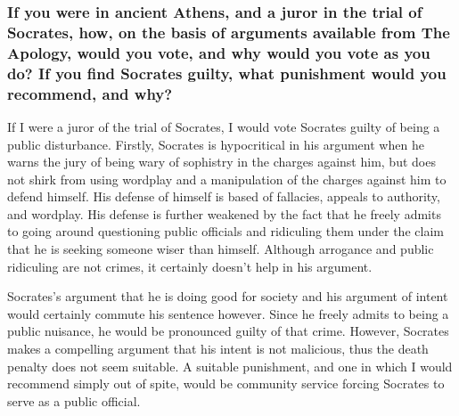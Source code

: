 \documentclass{article}
\begin{document}
\subsubsection*{If you were in ancient Athens, and a juror in the trial of
Socrates, how, on the basis of arguments available from The Apology, would you
vote, and why would you vote as you do? If you find Socrates guilty, what
punishment would you recommend, and why?}
If I were a juror of the trial of Socrates, I would vote Socrates guilty of being a public disturbance. Firstly, Socrates is hypocritical in his argument when he warns the jury of being wary of sophistry in the charges against him, but does not shirk from using wordplay and a manipulation of the charges against him to defend himself. His defense of himself is based of fallacies, appeals to authority, and wordplay. His defense is further weakened by the fact that he freely admits to going around questioning public officials and ridiculing them under the claim that he is seeking someone wiser than himself. Although arrogance and public ridiculing are not crimes, it certainly doesn't help in his argument. \par
Socrates's argument that he is doing good for society and his argument of intent would certainly commute his sentence however. Since he freely admits to being a public nuisance, he would be pronounced guilty of that crime. However, Socrates makes a compelling argument that his intent is not malicious, thus the death penalty does not seem suitable. A suitable punishment, and one in which I would recommend simply out of spite, would be community service forcing Socrates to serve as a public official.
\end{document}
